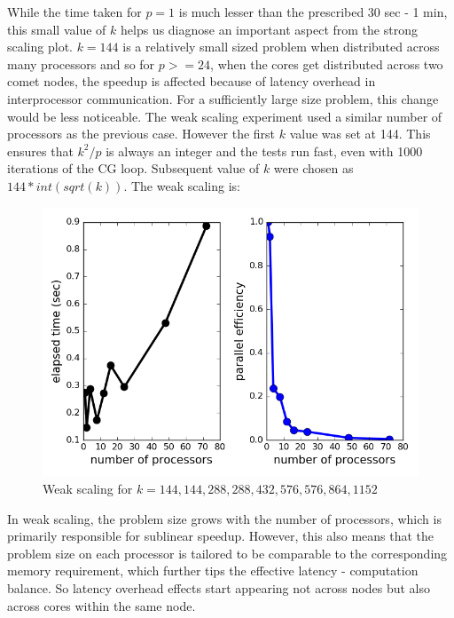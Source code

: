 \documentclass[12pt,letterpaper]{article}
\begin{document}
\noindent While the time taken for $p = 1$ is much lesser than the prescribed 30 sec - 1 min, this small value of $k$ helps us diagnose an important aspect from the strong scaling plot. $k = 144$ is a relatively small sized problem when distributed across many processors and so for $p >= 24$, when the cores get distributed across two comet nodes, the speedup is affected because of latency overhead in interprocessor communication. For a sufficiently large size problem, this change would be less noticeable.
\newpage
\noindent The weak scaling experiment used a similar number of processors as the previous case. However the first $k$ value was set at 144. This ensures that $k^2/p$ is always an integer and the tests run fast, even with 1000 iterations of the CG loop. Subsequent value of $k$ were chosen as $144 * int(sqrt(k))$. The weak scaling is:
%
\begin{figure}[h]
\centering
\includegraphics[scale = 0.7]{weakscale.png}
\caption{Weak scaling for $ k = 144, 144, 288, 288, 432, 576, 576, 864, 1152$}
\end{figure}

\noindent In weak scaling, the problem size grows with the number of processors, which is primarily responsible for sublinear speedup. However, this also means that the problem size on each processor is tailored to be comparable to the corresponding memory requirement, which further tips the effective latency - computation balance. So latency overhead effects start appearing not across nodes but also across cores within the same node.
\end{document}
